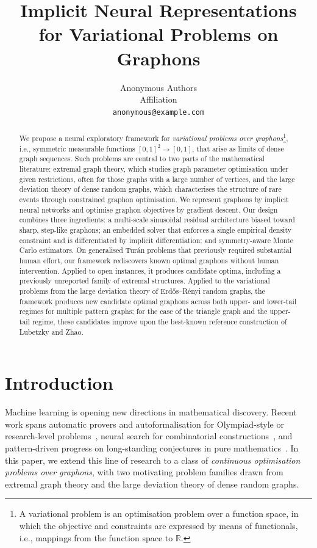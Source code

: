 \documentclass{article}
\title{Implicit Neural Representations \\ for Variational Problems on Graphons}
\author{%
  Anonymous Authors\\
  Affiliation \\
  \texttt{anonymous@example.com}
}
\theoremstyle{plain}
\theoremstyle{definition}
\theoremstyle{remark}
\begin{document}
\maketitle

\allowdisplaybreaks

\begin{abstract}
We propose a neural exploratory framework for \emph{variational problems over graphons}\footnote{A variational problem is an optimisation problem over a function space, in which the objective and constraints are expressed by means of functionals, i.e., mappings from the function space to $\mathbb{R}$.}, i.e., symmetric measurable functions $[0,1]^2 \to [0,1]$, that arise as limits of dense graph sequences. Such problems are central to two parts of the mathematical literature: extremal graph theory, which studies graph parameter optimisation under given restrictions, often for those graphs with a large number of vertices, and the large deviation theory of dense random graphs, which characterises the structure of rare events through constrained graphon optimisation. We represent graphons by implicit neural networks and optimise graphon objectives by gradient descent. Our design combines three ingredients: a multi-scale sinusoidal residual architecture biased toward sharp, step-like graphons; an embedded solver that enforces a single empirical density constraint and is differentiated by implicit differentiation; and symmetry-aware Monte Carlo estimators. On generalised Tur\'an problems that previously required substantial human effort, our framework rediscovers known optimal graphons without human intervention. Applied to open instances, it produces candidate optima, including a previously unreported family of extremal structures. Applied to the variational problems from the large deviation theory of Erd\H{o}s--R\'enyi random graphs, the framework produces new candidate optimal graphons across both upper- and lower-tail regimes for multiple pattern graphs; for the case of the triangle graph and the upper-tail regime, these candidates improve upon the best-known reference construction of Lubetzky and Zhao.
\end{abstract}


\section{Introduction} \label{sec:introduction}

Machine learning is opening new directions in mathematical discovery. Recent work spans automatic provers and autoformalisation for Olympiad-style or research-level problems~\citep{polu2023formal, trinh2024solving, jiang2023draft, wu2022autoformalization, hubert2026olympiad, huang2025winning,alexeev2026primitive}, neural search for combinatorial constructions~\citep{wagner2021constructions, charton2024patternboost, romera2024mathematical, novikov2025alphaevolve}, and pattern-driven progress on long-standing conjectures in pure mathematics~\citep{davies2021advancing, he2025murmurations}. In this paper, we extend this line of research to a class of \emph{continuous optimisation problems over graphons}, with two motivating problem families drawn from extremal graph theory and the large deviation theory of dense random graphs.
\end{document}
